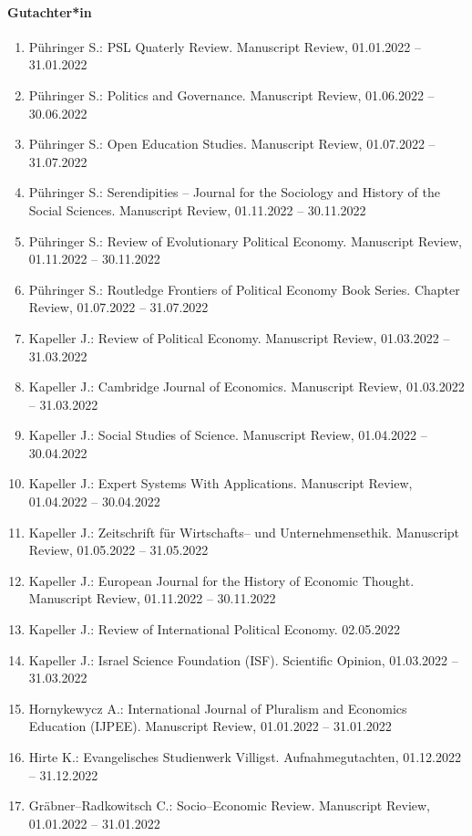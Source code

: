 \paragraph{Gutachter*in}
\begin{enumerate}[leftmargin=*, labelsep=0.5cm]
\item Pühringer S.: PSL Quaterly Review. Manuscript Review, 01.01.2022 -- 31.01.2022
\item Pühringer S.: Politics and Governance. Manuscript Review, 01.06.2022 -- 30.06.2022
\item Pühringer S.: Open Education Studies. Manuscript Review, 01.07.2022 -- 31.07.2022
\item Pühringer S.: Serendipities -- Journal for the Sociology and History of the Social Sciences. Manuscript Review, 01.11.2022 -- 30.11.2022
\item Pühringer S.: Review of Evolutionary Political Economy. Manuscript Review, 01.11.2022 -- 30.11.2022
\item Pühringer S.: Routledge Frontiers of Political Economy Book Series. Chapter Review, 01.07.2022 -- 31.07.2022
\item Kapeller J.: Review of Political Economy. Manuscript Review, 01.03.2022 -- 31.03.2022
\item Kapeller J.: Cambridge Journal of Economics. Manuscript Review, 01.03.2022 -- 31.03.2022
\item Kapeller J.: Social Studies of Science. Manuscript Review, 01.04.2022 -- 30.04.2022
\item Kapeller J.: Expert Systems With Applications. Manuscript Review, 01.04.2022 -- 30.04.2022
\item Kapeller J.: Zeitschrift für Wirtschafts-- und Unternehmensethik. Manuscript Review, 01.05.2022 -- 31.05.2022
\item Kapeller J.: European Journal for the History of Economic Thought. Manuscript Review, 01.11.2022 -- 30.11.2022
\item Kapeller J.: Review of International Political Economy. 02.05.2022
\item Kapeller J.: Israel Science Foundation (ISF). Scientific Opinion, 01.03.2022 -- 31.03.2022
\item Hornykewycz A.: International Journal of Pluralism and Economics Education (IJPEE). Manuscript Review, 01.01.2022 -- 31.01.2022
\item Hirte K.: Evangelisches Studienwerk Villigst. Aufnahmegutachten, 01.12.2022 -- 31.12.2022
\item Gräbner--Radkowitsch C.: Socio--Economic Review. Manuscript Review, 01.01.2022 -- 31.01.2022

\end{enumerate}
